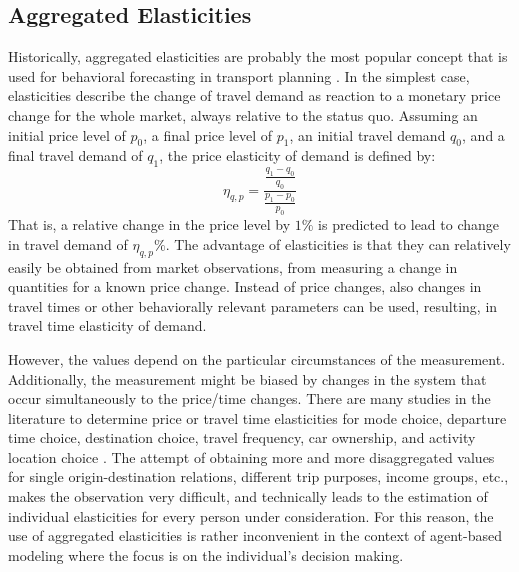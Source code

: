 \subsection{Aggregated Elasticities}
\label{ch:economicEval:describingBehavior:elasticities}
%
%
Historically, aggregated elasticities are probably the most popular concept that is used for behavioral forecasting in transport planning \citep[see, e.g.,][]{deJong2001Elasticities, 
GrahamGlaister2002FuelPriceElasticities, ParrySmall2005OptimalGasolineTax}.
%
In the simplest case, elasticities describe the change of travel demand as reaction to a monetary price change for the whole market, always relative to the status quo. Assuming an initial price level of $p_0$, a final price level of $p_1$, an initial travel demand $q_0$, and a final travel demand of $q_1$, the price elasticity of demand is defined by:
%
\begin{equation}
\eta_{q,p} = \frac{\frac{q_{1} - q_{0}}{q_{0}}}{\frac{p_{1} - p_{0}}{p_{0}}}
\end{equation}
%
That is, a relative change in the price level by $1\%$ is predicted to lead to change in travel demand of $\eta_{q,p} \%$.
%
The advantage of elasticities is that they can relatively easily be obtained from market observations, \ie from measuring a change in quantities for a known price change. Instead of price changes, also changes in travel times or other behaviorally relevant parameters can be used, resulting, \eg in travel time elasticity of demand.

However, the values depend on the particular circumstances of the measurement. Additionally, the measurement might be biased by changes in the system that occur simultaneously to the price/time changes.
%
There are many studies in the literature to determine price or travel time elasticities for mode choice, departure time choice, destination choice, travel frequency, car ownership, and activity location choice \citep[for an extensive literature review see, 
e.g.,][]{deJong2001Elasticities}. The attempt of obtaining more and more disaggregated values for single origin-destination relations, different trip purposes, income groups, etc., makes the observation very difficult, and technically leads to the estimation of individual elasticities for every person under consideration.
%
For this reason, the use of aggregated elasticities is rather inconvenient in the context of agent-based modeling where the focus is on the individual's decision making. 
%
%

